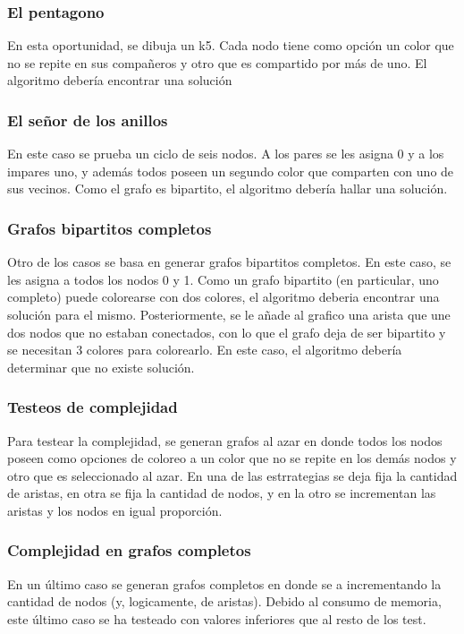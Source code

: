 \subsubsection{El pentagono}
En esta oportunidad, se dibuja un k5. Cada nodo tiene como opción un color que no se repite en sus compañeros y otro que es compartido por más de uno. El algoritmo debería encontrar una solución
\subsubsection{El señor de los anillos}
En este caso se prueba un ciclo de seis nodos. A los pares se les asigna 0 y a los impares uno, y además todos poseen un segundo color que comparten con uno de sus vecinos. Como el grafo es bipartito, el algoritmo debería hallar una solución.
\subsubsection{Grafos bipartitos completos}
Otro de los casos se basa en generar grafos bipartitos completos. En este caso, se les asigna a todos los nodos 0 y 1. Como un grafo bipartito (en particular, uno completo) puede colorearse con dos colores, el algoritmo deberia encontrar una solución para el mismo. Posteriormente, se le añade al grafico una arista que une dos nodos que no estaban conectados, con lo que el grafo deja de ser bipartito y se necesitan 3 colores para colorearlo. En este caso, el algoritmo debería determinar que no existe solución.

\subsubsection{Testeos de complejidad}
Para testear la complejidad, se generan grafos al azar en donde todos los nodos poseen como opciones de coloreo a un color que no se repite en los demás nodos y otro que es seleccionado al azar. En una de las estrrategias se deja fija la cantidad de aristas, en otra se fija la cantidad de nodos, y en la otro se incrementan las aristas y los nodos en igual proporción.

\subsubsection{Complejidad en grafos completos}
En un último caso se generan grafos completos en donde se a incrementando la cantidad de nodos (y, logicamente, de aristas). Debido al consumo de memoria, este último caso se ha testeado con valores inferiores que al resto de los test.




